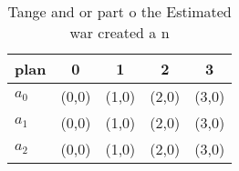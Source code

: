 \documentclass[a4paper]{article}
\begin{document}
\begin{table}
\begin{adjustbox}{width=0.6\columnwidth}
\begin{tabular}{|l|l|l|l|l|}
\hline
\textbf{plan} & \multicolumn{1}{c|}{\textbf{0}} & \multicolumn{1}{c|}{\textbf{1}} & \multicolumn{1}{c|}{\textbf{2}} & \multicolumn{1}{c|}{\textbf{3}} \\ \hline
\textbf{$a_0$}  & (0,0) & (1,0) & (2,0) & (3,0) \\ \hline
\textbf{$a_1$}  & (0,0) & (1,0) & (2,0) & (3,0) \\ \hline
\textbf{$a_2$}  & (0,0) & (1,0) & (2,0) & (3,0) \\ \hline
\end{tabular}
\end{adjustbox}
\caption{Tange and or part o the Estimated war created a n
}
\end{table}
\end{document}
